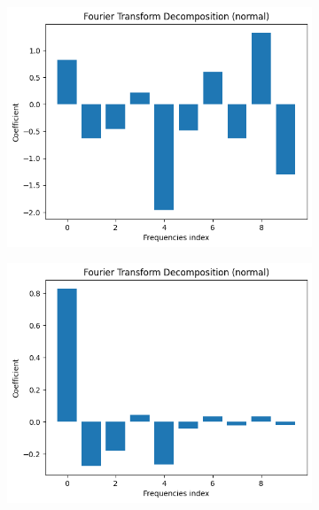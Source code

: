\documentclass[12pt]{article}
\begin{document}
\begin{figure}[h!]
\centering
\begin{subfigure}{.5\textwidth}
  \centering
  \includegraphics[width=1\linewidth]{images/ft-t1.png}
\end{subfigure}%
\begin{subfigure}{.5\textwidth}
  \centering
  \includegraphics[width=1\linewidth]{images/ft-t2.png}
\end{subfigure}
\begin{subfigure}{.5\textwidth}
  \centering

\end{subfigure}
\end{figure}
\end{document}
